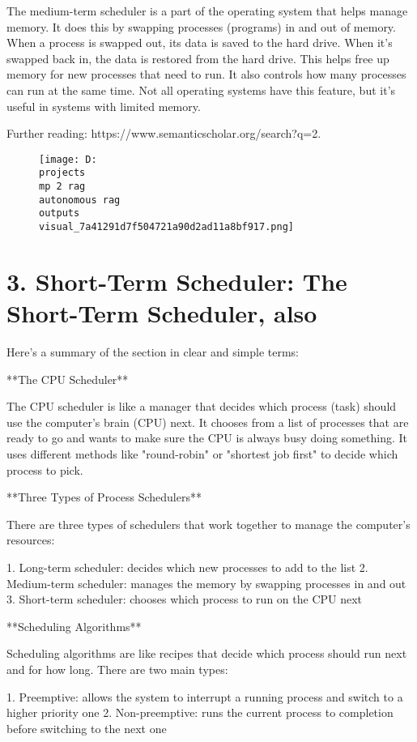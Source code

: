 \documentclass[12pt,a4paper]{article}
\begin{document}
The medium-term scheduler is a part of the operating system that helps manage memory. It does this by swapping processes (programs) in and out of memory. When a process is swapped out, its data is saved to the hard drive. When it's swapped back in, the data is restored from the hard drive. This helps free up memory for new processes that need to run. It also controls how many processes can run at the same time. Not all operating systems have this feature, but it's useful in systems with limited memory.

Further reading: https://www.semanticscholar.org/search?q=2.%
\begin{figure}[h]
\centering
\texttt{[image: D:\\projects\\mp 2 rag\\autonomous rag\\outputs\\visual\_7a41291d7f504721a90d2ad11a8bf917.png]}
\end{figure}
\section{3. Short-Term Scheduler: The Short-Term Scheduler, also}
Here's a summary of the section in clear and simple terms:

**The CPU Scheduler**

The CPU scheduler is like a manager that decides which process (task) should use the computer's brain (CPU) next. It chooses from a list of processes that are ready to go and wants to make sure the CPU is always busy doing something. It uses different methods like "round-robin" or "shortest job first" to decide which process to pick.

**Three Types of Process Schedulers**

There are three types of schedulers that work together to manage the computer's resources:

1. Long-term scheduler: decides which new processes to add to the list
2. Medium-term scheduler: manages the memory by swapping processes in and out
3. Short-term scheduler: chooses which process to run on the CPU next

**Scheduling Algorithms**

Scheduling algorithms are like recipes that decide which process should run next and for how long. There are two main types:

1. Preemptive: allows the system to interrupt a running process and switch to a higher priority one
2. Non-preemptive: runs the current process to completion before switching to the next one
\end{document}
